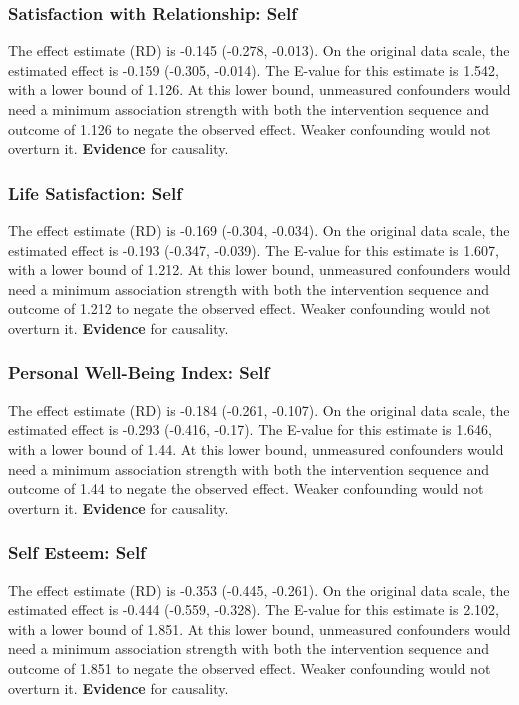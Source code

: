 \documentclass[
  singlecolumn]{article}
\begin{document}
\subsubsection{Satisfaction with Relationship:
Self}\label{satisfaction-with-relationship-self-16}

The effect estimate (RD) is -0.145 (-0.278, -0.013). On the original
data scale, the estimated effect is -0.159 (-0.305, -0.014). The E-value
for this estimate is 1.542, with a lower bound of 1.126. At this lower
bound, unmeasured confounders would need a minimum association strength
with both the intervention sequence and outcome of 1.126 to negate the
observed effect. Weaker confounding would not overturn it.
\textbf{Evidence} for causality.

\subsubsection{Life Satisfaction: Self}\label{life-satisfaction-self-16}

The effect estimate (RD) is -0.169 (-0.304, -0.034). On the original
data scale, the estimated effect is -0.193 (-0.347, -0.039). The E-value
for this estimate is 1.607, with a lower bound of 1.212. At this lower
bound, unmeasured confounders would need a minimum association strength
with both the intervention sequence and outcome of 1.212 to negate the
observed effect. Weaker confounding would not overturn it.
\textbf{Evidence} for causality.

\subsubsection{Personal Well-Being Index:
Self}\label{personal-well-being-index-self-16}

The effect estimate (RD) is -0.184 (-0.261, -0.107). On the original
data scale, the estimated effect is -0.293 (-0.416, -0.17). The E-value
for this estimate is 1.646, with a lower bound of 1.44. At this lower
bound, unmeasured confounders would need a minimum association strength
with both the intervention sequence and outcome of 1.44 to negate the
observed effect. Weaker confounding would not overturn it.
\textbf{Evidence} for causality.

\subsubsection{Self Esteem: Self}\label{self-esteem-self-16}

The effect estimate (RD) is -0.353 (-0.445, -0.261). On the original
data scale, the estimated effect is -0.444 (-0.559, -0.328). The E-value
for this estimate is 2.102, with a lower bound of 1.851. At this lower
bound, unmeasured confounders would need a minimum association strength
with both the intervention sequence and outcome of 1.851 to negate the
observed effect. Weaker confounding would not overturn it.
\textbf{Evidence} for causality.
\end{document}
